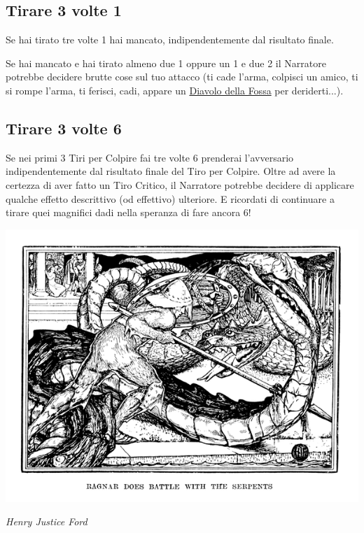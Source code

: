 \begin{multicols}{2}
\subsection{Tirare 3 volte 1}\label{tiraretrevolteuno}

Se hai tirato tre volte 1 hai mancato, indipendentemente dal risultato finale.

Se hai mancato e hai tirato almeno due 1 oppure un 1 e due 2 il Narratore potrebbe decidere brutte cose sul tuo attacco (ti cade l'arma, colpisci un amico, ti si rompe l'arma, ti ferisci, cadi, appare un \hyperlink{Diavolo della Fossa}{Diavolo della Fossa} per deriderti...).

\subsection{Tirare 3 volte 6}\label{tiraretrevoltesei}

Se nei primi 3 Tiri per Colpire fai tre volte 6 prenderai l'avversario indipendentemente dal risultato finale del Tiro per Colpire. Oltre ad avere la certezza di aver fatto un Tiro Critico, il Narratore potrebbe decidere di applicare qualche effetto descrittivo (od effettivo) ulteriore. E ricordati di continuare a tirare quei magnifici dadi nella speranza di fare ancora 6!

\begin{center}
	\includegraphics[width=0.9\linewidth]{immagini/critico.png}

	\emph{Henry Justice Ford}
\end{center}


\end{multicols}
